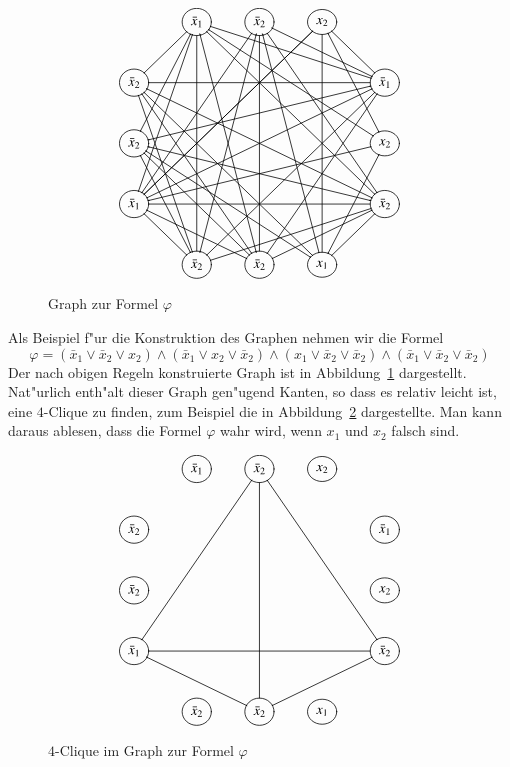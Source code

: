 \begin{beispiel}
\begin{figure}
\[
\entrymodifiers={++[o][F]}
\xymatrix{
*+\txt{}
	&{\bar x_1}
		\ar@{-}[dl] \ar@{-}[ddl] \ar@{-}[dddl]
		\ar@{-}[dddd] \ar@{-}[ddddr] 
		\ar@{-}[drrr] \ar@{-}[ddrrr] \ar@{-}[dddrrr]
		&{\bar x_2}
			\ar@{-}[dddll]
			\ar@{-}[ddddl] \ar@{-}[dddd] \ar@{-}[ddddr]
			\ar@{-}[drr] \ar@{-}[dddrr]
			&{x_2}
				\ar@{-}[dddlll] \ar@{-}[dddlll]
				\ar@{-}[dddd]
				\ar@{-}[dr] \ar@{-}[ddr]
\\
{\bar x_2}
	\ar@{-}[rrrr] \ar@{-}[rrrrdd]
	\ar@{-}[dddr] \ar@{-}[dddrr] \ar@{-}[dddrrr]
	&*+\txt{}
		&*+\txt{}
			&*+\txt{}
				&{\bar x_1}
					\ar@{-}[dllll] \ar@{-}[ddllll]
					\ar@{-}[dddlll] \ar@{-}[dddll]
\\
{\bar x_2}
	\ar@{-}[rrrrd]
	\ar@{-}[ddr] \ar@{-}[ddrr] \ar@{-}[ddrrr]
	&*+\txt{}
		&*+\txt{}
			&*+\txt{}
				&{x_2}
					\ar@{-}[dllll]
					\ar@{-}[ddl]
\\
{\bar x_1}
	\ar@{-}[rrrr]
	\ar@{-}[dr] \ar@{-}[drr]
	&*+\txt{}
		&*+\txt{}
			&*+\txt{}
				&{\bar x_2}
					\ar@{-}[dlll] \ar@{-}[dll] \ar@{-}[dl]
\\
*+\txt{}
	&{\bar x_2}
		&{\bar x_2}
			&{x_1}
}
\]
\caption{Graph zur Formel $\varphi$\label{phiformel}}
\end{figure}%
Als Beispiel f"ur die Konstruktion des Graphen nehmen wir die Formel
\[
\varphi
=
(\bar x_1\vee \bar x_2\vee x_2)
\wedge
(\bar x_1\vee x_2\vee \bar x_2)
\wedge
(x_1\vee \bar x_2\vee \bar x_2)
\wedge
(\bar x_1\vee \bar x_2\vee \bar x_2)
\]
Der nach obigen Regeln konstruierte Graph ist in Abbildung~\ref{phiformel}
dargestellt.
Nat"urlich enth"alt dieser Graph gen"ugend Kanten, so dass es relativ
leicht ist, eine $4$-Clique zu finden, zum Beispiel die in Abbildung~\ref{phiclique} dargestellte. Man kann daraus ablesen, dass die Formel $\varphi$
wahr wird, wenn $x_1$ und $x_2$ falsch sind.
\begin{figure}
\[
\entrymodifiers={++[o][F]}
\xymatrix{
*+\txt{}
	&{\bar x_1}
		&{\bar x_2}
			\ar@{-}[dddll]
			\ar@{-}[dddd]
			\ar@{-}[dddrr]
			&{x_2}
\\
{\bar x_2}
	&*+\txt{}
		&*+\txt{}
			&*+\txt{}
				&{\bar x_1}
\\
{\bar x_2}
	&*+\txt{}
		&*+\txt{}
			&*+\txt{}
				&{x_2}
\\
{\bar x_1}
	\ar@{-}[rrrr]
	\ar@{-}[drr]
	&*+\txt{}
		&*+\txt{}
			&*+\txt{}
				&{\bar x_2}
					\ar@{-}[dll]
\\
*+\txt{}
	&{\bar x_2}
		&{\bar x_2}
			&{x_1}
}
\]
\caption{$4$-Clique im Graph zur Formel $\varphi$\label{phiclique}}
\end{figure}%
\end{beispiel}

